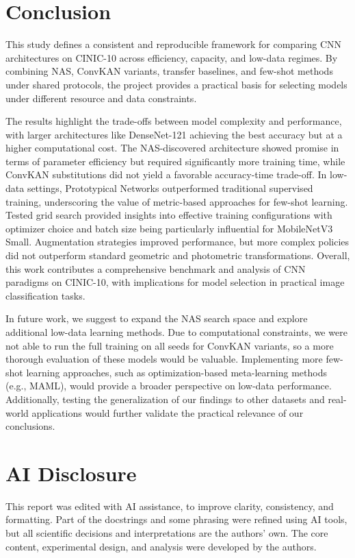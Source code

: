 \documentclass[cameraready]{Interspeech}
\begin{document}
\section{Conclusion}
This study defines a consistent and reproducible framework for comparing CNN architectures on CINIC-10 across efficiency, capacity, and low-data regimes. By combining NAS, ConvKAN variants, transfer baselines, and few-shot methods under shared protocols, the project provides a practical basis for selecting models under different resource and data constraints.

The results highlight the trade-offs between model complexity and performance, with larger architectures like DenseNet-121 achieving the best accuracy but at a higher computational cost. The NAS-discovered architecture showed promise in terms of parameter efficiency but required significantly more training time, while ConvKAN substitutions did not yield a favorable accuracy-time trade-off. In low-data settings, Prototypical Networks outperformed traditional supervised training, underscoring the value of metric-based approaches for few-shot learning. Tested grid search provided insights into effective training configurations with optimizer choice and batch size being particularly influential for MobileNetV3 Small. Augmentation strategies improved performance, but more complex policies did not outperform standard geometric and photometric transformations. Overall, this work contributes a comprehensive benchmark and analysis of CNN paradigms on CINIC-10, with implications for model selection in practical image classification tasks.

In future work, we suggest to expand the NAS search space and explore additional low-data learning methods. Due to computational constraints, we were not able to run the full training on all seeds for ConvKAN variants, so a more thorough evaluation of these models would be valuable. Implementing more few-shot learning approaches, such as optimization-based meta-learning methods (e.g., MAML), would provide a broader perspective on low-data performance. Additionally, testing the generalization of our findings to other datasets and real-world applications would further validate the practical relevance of our conclusions.

\section{AI Disclosure}
This report was edited with AI assistance, to improve clarity, consistency, and formatting. Part of the docstrings and some phrasing were refined using AI tools, but all scientific decisions and interpretations are the authors' own. The core content, experimental design, and analysis were developed by the authors.
\end{document}
